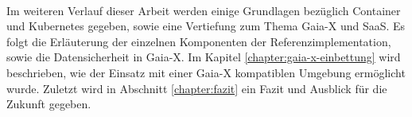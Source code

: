 \paragraph{}
Im weiteren Verlauf dieser Arbeit werden einige Grundlagen bezüglich Container und Kubernetes gegeben,
sowie eine Vertiefung zum Thema Gaia-X und \acf{SaaS}.
Es folgt die Erläuterung der einzelnen Komponenten der Referenzimplementation, sowie die Datensicherheit in Gaia-X.
Im Kapitel \ref{chapter:gaia-x-einbettung} wird beschrieben, wie der Einsatz mit einer Gaia-X kompatiblen Umgebung ermöglicht wurde.
Zuletzt wird in Abschnitt \ref{chapter:fazit} ein Fazit und Ausblick für die Zukunft gegeben.